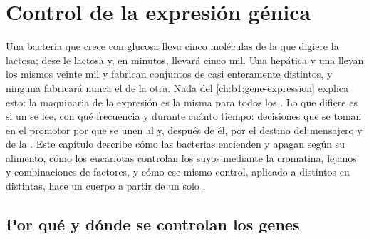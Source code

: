 \chapter{Control de la expresión génica}\label{ch:b1:expression-control}

Una bacteria que crece con glucosa lleva cinco moléculas de la  que
digiere la lactosa; dese le lactosa y, en minutos, llevará cinco mil. Una
 hepática y una  llevan los mismos veinte mil  y fabrican
conjuntos de  casi enteramente distintos, y ninguna fabricará nunca
el de la otra. Nada del \cref{ch:b1:gene-expression} explica esto: la
maquinaria de la expresión es la misma para todos los . Lo que difiere
es si un  se lee, con qué frecuencia y durante cuánto tiempo: decisiones
que se toman en el promotor por  que se unen al  y, después de
él, por el destino del mensajero y de la . Este capítulo describe
cómo las bacterias encienden y apagan  según su alimento, cómo los
eucariotas controlan los suyos mediante la cromatina,  lejanos
y combinaciones de factores, y cómo ese mismo control, aplicado a 
distintos en  distintas, hace un cuerpo a partir de un solo .

\section{Por qué y dónde se controlan los genes}

